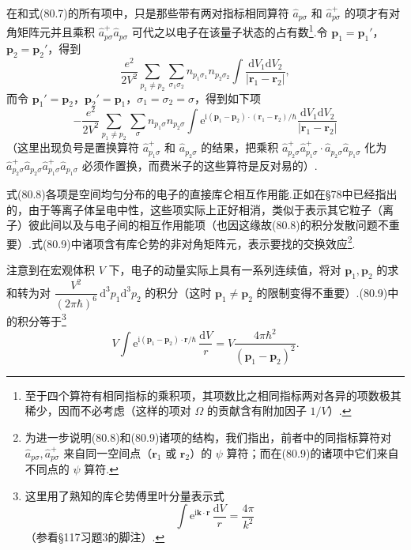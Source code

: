 在和式(80.7)的所有项中，只是那些带有两对指标相同算符 $\hat{a}_{p\sigma}$ 和 $\hat{a}^{+}_{p\sigma}$ 的项才有对角矩阵元并且乘积 $\hat{a}^{+}_{p\sigma}\hat{a}_{p\sigma}$ 可代之以电子在该量子状态的占有数\footnote{至于四个算符有相同指标的乘积项，其项数比之相同指标两对各异的项数极其稀少，因而不必考虑（这样的项对 $\Omega$ 的贡献含有附加因子 $1/V$）.}.令 $\boldsymbol{p}_1=\boldsymbol{p}_1'$，$\boldsymbol{p}_2=\boldsymbol{p}_2'$，得到
\begin{equation}
  \frac{e^2}{2V^2}\sum_{p_1\neq p_2}\sum_{\sigma_1\sigma_2}
  n_{p_1\sigma_1}n_{p_2\sigma_2}
  \int\frac{\mathrm{d}V_1\mathrm{d}V_2}
  {\left|\boldsymbol{r}_1-\boldsymbol{r}_2\right|},
\end{equation}
而令 $\boldsymbol{p}_1'=\boldsymbol{p}_2$，$\boldsymbol{p}_2'=\boldsymbol{p}_1$，$\sigma_1=\sigma_2=\sigma$，得到如下项
\begin{equation}
  -\frac{e^2}{2V^2}\sum_{p_1\neq p_2}\sum_{\sigma}
  n_{p_1\sigma}n_{p_2\sigma}
  \int\mathrm{e}^{\mathrm{i}(\boldsymbol{p}_1-\boldsymbol{p}_2)\cdot
  (\boldsymbol{r}_1-\boldsymbol{r}_2)/\hbar}
  \frac{\mathrm{d}V_1\mathrm{d}V_2}
  {\left|\boldsymbol{r}_1-\boldsymbol{r}_2\right|}
\end{equation}
（这里出现负号是置换算符 $\hat{a}^{+}_{p_1\sigma}$ 和 $\hat{a}_{p_2\sigma}$ 的结果，把乘积
$\hat{a}^{+}_{p_2\sigma}\hat{a}^{+}_{p_1\sigma}\cdot\hat{a}_{p_2\sigma}\hat{a}_{p_1\sigma}$
化为
$\hat{a}^{+}_{p_2\sigma}\hat{a}_{p_2\sigma}\hat{a}^{+}_{p_1\sigma}\hat{a}_{p_1\sigma}$
必须作置换，而费米子的这些算符是反对易的）.

式(80.8)各项是空间均匀分布的电子的直接库仑相互作用能.正如在§78中已经指出的，由于等离子体呈电中性，这些项实际上正好相消，类似于表示其它粒子（离子）彼此间以及与电子间的相互作用能项（也因这缘故(80.8)的积分发散问题不重要）.式(80.9)中诸项含有库仑势的非对角矩阵元，表示要找的交换效应\footnote{为进一步说明(80.8)和(80.9)诸项的结构，我们指出，前者中的同指标算符对 $\hat{a}_{p\sigma},\hat{a}^{+}_{p\sigma}$ 来自同一空间点（$\boldsymbol{r}_1$ 或 $\boldsymbol{r}_2$）的 $\psi$ 算符；而在(80.9)的诸项中它们来自不同点的 $\psi$ 算符.}.

注意到在宏观体积 $V$ 下，电子的动量实际上具有一系列连续值，将对 $\boldsymbol{p}_1,\boldsymbol{p}_2$ 的求和转为对
$\dfrac{V^2}{(2\pi\hbar)^6}\,\mathrm{d}^3p_1\mathrm{d}^3p_2$
的积分（这时 $\boldsymbol{p}_1\neq\boldsymbol{p}_2$ 的限制变得不重要）.(80.9)中的积分等于\footnote{这里用了熟知的库仑势傅里叶分量表示式
\begin{equation*}
  \int\mathrm{e}^{\mathrm{i}\boldsymbol{k}\cdot\boldsymbol{r}}\,\frac{\mathrm{d}V}{r}
  =\frac{4\pi}{k^2}
\end{equation*}
（参看§117习题3的脚注）.}
\begin{equation*}
  V\int\mathrm{e}^{\mathrm{i}(\boldsymbol{p}_1-\boldsymbol{p}_2)\cdot\boldsymbol{r}/\hbar}
  \,\frac{\mathrm{d}V}{r}
  =V\frac{4\pi\hbar^2}{(\boldsymbol{p}_1-\boldsymbol{p}_2)^2}.
\end{equation*}

